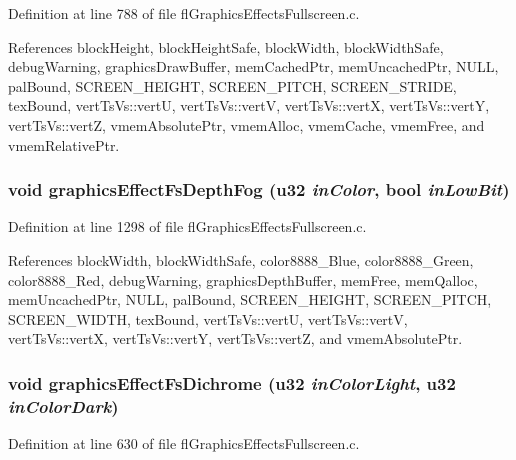 Definition at line 788 of file fl\-Graphics\-Effects\-Fullscreen.c.

References block\-Height, block\-Height\-Safe, block\-Width, block\-Width\-Safe, debug\-Warning, graphics\-Draw\-Buffer, mem\-Cached\-Ptr, mem\-Uncached\-Ptr, NULL, pal\-Bound, SCREEN\_\-HEIGHT, SCREEN\_\-PITCH, SCREEN\_\-STRIDE, tex\-Bound, vert\-Ts\-Vs::vert\-U, vert\-Ts\-Vs::vert\-V, vert\-Ts\-Vs::vert\-X, vert\-Ts\-Vs::vert\-Y, vert\-Ts\-Vs::vert\-Z, vmem\-Absolute\-Ptr, vmem\-Alloc, vmem\-Cache, vmem\-Free, and vmem\-Relative\-Ptr.
\subsubsection{\setlength{\rightskip}{0pt plus 5cm}void graphics\-Effect\-Fs\-Depth\-Fog (u32 {\em in\-Color}, {\bf bool} {\em in\-Low\-Bit})}\label{flGraphicsEffectsFullscreen_8h_9a2b81c1973c1834558b38e0c5c9d6a3}




Definition at line 1298 of file fl\-Graphics\-Effects\-Fullscreen.c.

References block\-Width, block\-Width\-Safe, color8888\_\-Blue, color8888\_\-Green, color8888\_\-Red, debug\-Warning, graphics\-Depth\-Buffer, mem\-Free, mem\-Qalloc, mem\-Uncached\-Ptr, NULL, pal\-Bound, SCREEN\_\-HEIGHT, SCREEN\_\-PITCH, SCREEN\_\-WIDTH, tex\-Bound, vert\-Ts\-Vs::vert\-U, vert\-Ts\-Vs::vert\-V, vert\-Ts\-Vs::vert\-X, vert\-Ts\-Vs::vert\-Y, vert\-Ts\-Vs::vert\-Z, and vmem\-Absolute\-Ptr.
\subsubsection{\setlength{\rightskip}{0pt plus 5cm}void graphics\-Effect\-Fs\-Dichrome (u32 {\em in\-Color\-Light}, u32 {\em in\-Color\-Dark})}\label{flGraphicsEffectsFullscreen_8h_e79afa2a4e14dec02855e84ba168afde}




Definition at line 630 of file fl\-Graphics\-Effects\-Fullscreen.c.

